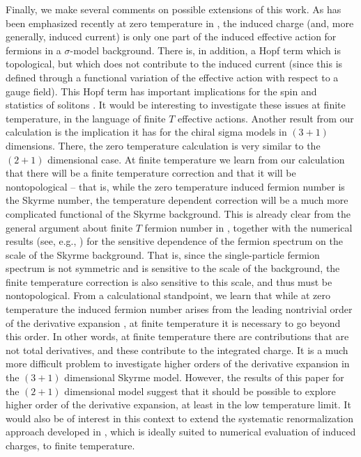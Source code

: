 \documentclass[a4paper,prd]{revtex4}
\begin{document}
Finally, we make several comments on possible extensions of this work. As has been
emphasized recently at zero temperature in \cite{aw,abanov}, the induced charge (and,
more generally, induced current) is only one part of the induced effective action for
fermions in a $\sigma$-model background. There is, in addition, a Hopf term which is
topological, but which does not contribute to the induced current (since
this is defined through a functional variation of the effective action
with respect to a gauge field). This Hopf term has important implications
for the spin and statistics of solitons \cite{wilczekzee,aw,abanov}. It
would be interesting to investigate these issues at finite temperature,
in the language of finite $T$ effective actions. Another result from our
calculation is the implication it has for the chiral sigma models in
$(3+1)$ dimensions. There, the zero temperature calculation is very similar to the $(2+1)$
dimensional case. At finite temperature we learn from our calculation that there will
be a finite temperature correction and that it will be nontopological -- that is,
while the zero temperature induced fermion number is the Skyrme number, the
temperature dependent correction will be a much more complicated functional of the
Skyrme background. This is already clear from the general argument about finite $T$
fermion number in \cite{dr}, together with the numerical results (see, e.g.,
\cite{ripka}) for the sensitive dependence of the fermion spectrum on the scale of
the Skyrme background. That is, since the single-particle fermion spectrum
is not symmetric and is sensitive to the scale of the background, the
finite temperature correction is also sensitive to this scale, and thus
must be nontopological. From a calculational standpoint, we learn that
while at zero temperature the induced fermion number arises from the
leading nontrivial order of the derivative expansion
\cite{eric,ian}, at finite temperature it is necessary to go beyond this
order. In other words, at finite temperature there are contributions that
are not total derivatives, and these contribute to the integrated charge.
It is a much more difficult problem to investigate higher orders of the
derivative expansion in the $(3+1)$ dimensional Skyrme model. However,
the results of this paper for the $(2+1)$ dimensional model suggest
that it should be possible to explore higher order of the derivative
expansion, at least in the low temperature limit. It would also be of
interest in this context to extend the systematic renormalization approach
developed in \cite{jaffe2,noah}, which is ideally suited to numerical
evaluation of induced charges, to finite temperature.
 
\end{document}
